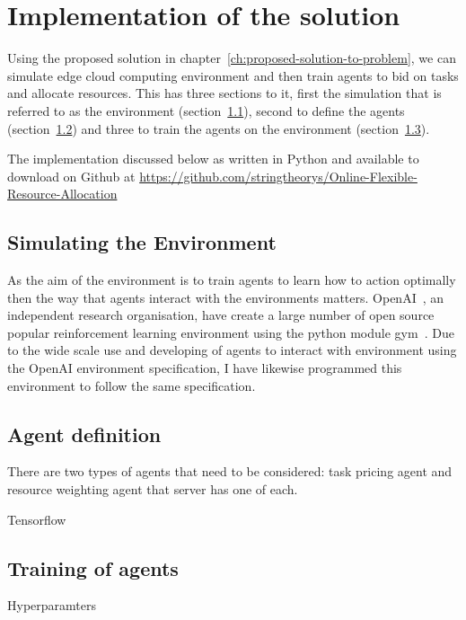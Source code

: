 \chapter{Implementation of the solution}\label{ch:implementation-of-the-solution}
Using the proposed solution in chapter~\ref{ch:proposed-solution-to-problem}, we can simulate edge cloud computing
environment and then train agents to bid on tasks and allocate resources. This has three sections to it, first the
simulation that is referred to as the environment (section~\ref{sec:simulating-the-environment}),
second to define the agents (section~\ref{sec:agent-definition}) and three to train the agents on the
environment (section~\ref{sec:training-of-agents}).

The implementation discussed below as written in Python and available to download on Github at
\url{https://github.com/stringtheorys/Online-Flexible-Resource-Allocation}

\section{Simulating the Environment}\label{sec:simulating-the-environment}
As the aim of the environment is to train agents to learn how to action optimally then the way that agents
interact with the environments matters. OpenAI~\cite{}, an independent research organisation, have create a large
number of open source popular reinforcement learning environment using the python module gym~\cite{}.
Due to the wide scale use and developing of agents to interact with environment using the OpenAI environment
specification, I have likewise programmed this environment to follow the same specification. %

\section{Agent definition}\label{sec:agent-definition}
There are two types of agents that need to be considered: task pricing agent and resource weighting agent that server
has one of each.

Tensorflow

\section{Training of agents}\label{sec:training-of-agents}
Hyperparamters
